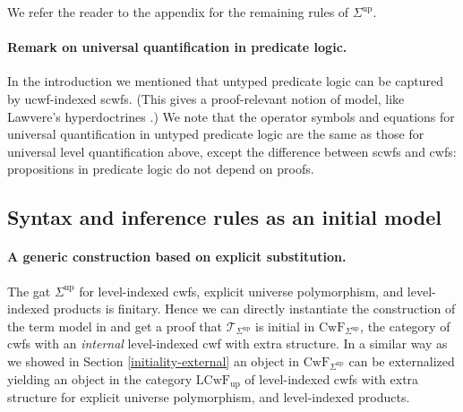 \documentclass[submission,copyright,creativecommons]{eptcs}
\newcommand{\T}{\mathsf{T}}
\def\T{\mathcal{T}}
\def\CwF{\mathrm{CwF}}
\def\LCwF{\mathrm{LCwF}}
\def\LCwFint{\LCwF_{\mathrm{up}}}
\def\Sigmaint{{\Sigma^\mathrm{up}}}
\begin{document}
We refer the reader to the appendix for the remaining rules of $\Sigmaint$.

\paragraph{Remark on universal quantification in predicate logic.}

In the introduction we mentioned that untyped predicate logic can be captured by ucwf-indexed scwfs. (This gives a proof-relevant notion of model, like Lawvere's hyperdoctrines \cite{lawvere:hyperdoctrines}.) We note that the operator symbols and equations for universal quantification in untyped predicate logic are the same as those for universal level quantification above, except the difference between scwfs and cwfs: propositions in predicate logic do not depend on proofs.

\subsection{Syntax and inference rules as an initial model}\label{initiality-internal}

\paragraph{A generic construction based on explicit substitution.} The gat $\Sigmaint$ for level-indexed cwfs, explicit universe polymorphism, and level-indexed products is finitary. Hence we can directly instantiate the construction of the term model in \cite{bezem:hofmann} and get a proof that $\T_{\Sigmaint}$ is initial in $\CwF_{\Sigmaint}$, the category of cwfs with an {\em internal} level-indexed cwf with extra structure. In a similar way as we showed in Section \ref{initiality-external} an object in $\CwF_{\Sigmaint}$ can be externalized yielding an object in the category $\LCwFint$ of level-indexed cwfs with extra structure for explicit universe polymorphism, and level-indexed products.
\end{document}
